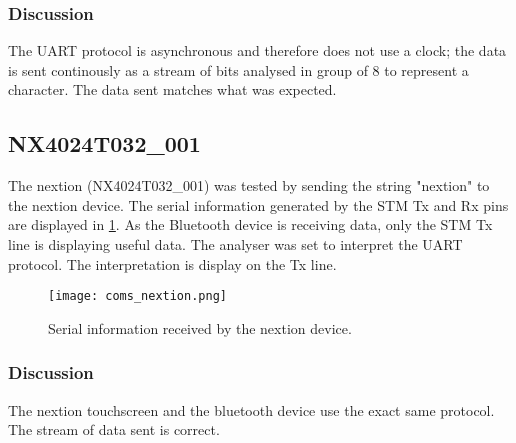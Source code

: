 \subsubsection{Discussion}
The UART protocol is asynchronous and therefore does not use a clock; the data is sent continously as a stream of bits analysed in group of 8 to represent a character. The data sent matches what was expected. 

\subsection{NX4024T032\_001}
The nextion (NX4024T032\_001) was tested by sending the string "nextion" to the nextion device. The serial information generated by the STM Tx and Rx pins are displayed in \cref{fig:coms_nextion}. As the Bluetooth device is receiving data, only the STM Tx line is displaying useful data. The analyser was set to interpret the UART protocol. The interpretation is display on the Tx line. 
\begin{figure}[h!]
	\centering
	\texttt{[image: coms\_nextion.png]}
	\caption{Serial information received by the nextion device.}
	\label{fig:coms_nextion}
\end{figure}
\subsubsection{Discussion}
The nextion touchscreen and the bluetooth device use the exact same protocol. The stream of data sent is correct. 

